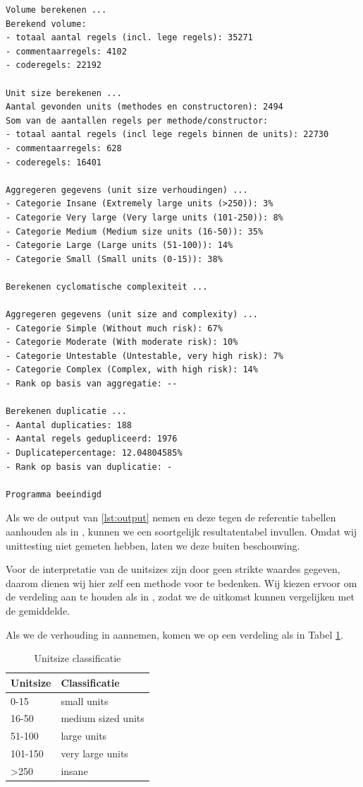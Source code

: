 \documentclass[a4paper]{article}
\begin{document}
\begin{lstlisting}[caption={Programma output SmallSQL},label={lst:output},frame = single]
Volume berekenen ...
Berekend volume: 
- totaal aantal regels (incl. lege regels): 35271
- commentaarregels: 4102
- coderegels: 22192

Unit size berekenen ...
Aantal gevonden units (methodes en constructoren): 2494
Som van de aantallen regels per methode/constructor: 
- totaal aantal regels (incl lege regels binnen de units): 22730
- commentaarregels: 628
- coderegels: 16401

Aggregeren gegevens (unit size verhoudingen) ...
- Categorie Insane (Extremely large units (>250)): 3%
- Categorie Very large (Very large units (101-250)): 8%
- Categorie Medium (Medium size units (16-50)): 35%
- Categorie Large (Large units (51-100)): 14%
- Categorie Small (Small units (0-15)): 38%

Berekenen cyclomatische complexiteit ...

Aggregeren gegevens (unit size and complexity) ...
- Categorie Simple (Without much risk): 67%
- Categorie Moderate (With moderate risk): 10%
- Categorie Untestable (Untestable, very high risk): 7%
- Categorie Complex (Complex, with high risk): 14%
- Rank op basis van aggregatie: --

Berekenen duplicatie ...
- Aantal duplicaties: 188
- Aantal regels gedupliceerd: 1976
- Duplicatepercentage: 12.04804585%
- Rank op basis van duplicatie: -

Programma beeindigd
\end{lstlisting}
Als we de output van \ref{lst:output} nemen en deze tegen de referentie tabellen aanhouden als in \cite{A}, kunnen we een soortgelijk resultatentabel invullen. Omdat wij unittesting niet gemeten hebben, laten we deze buiten beschouwing.

Voor de interpretatie van de unitsizes zijn door \cite{A} geen strikte waardes gegeven, daarom dienen wij hier zelf een methode voor te bedenken.
Wij kiezen ervoor om de verdeling aan te houden als in \cite{B}, zodat we de uitkomst kunnen vergelijken met de gemiddelde.

Als we de verhouding in \cite{B} aannemen, komen we op een verdeling als in Tabel \ref{tbl:UnitSizeClassificatie}.

\begin{table}[h]
\caption{Unitsize classificatie}
\label{tbl:UnitSizeClassificatie}
\begin{tabular}{|l|l|}
\hline
Unitsize         & Classificatie      \\ \hline
0-15             & small units        \\
16-50            & medium sized units \\
51-100           & large units        \\
101-150          & very large units   \\
\textgreater{}250& insane             \\ \hline
\end{tabular}
\end{table}
\end{document}

